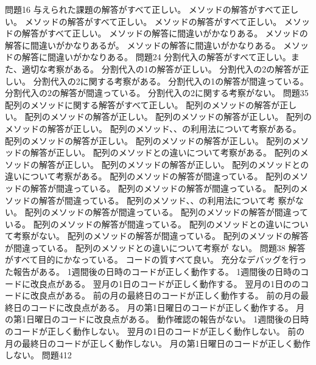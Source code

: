 {{問題1}{6}{
  {与えられた課題の解答がすべて正しい。}
	}
	{
	{メソッドの解答がすべて正しい。}
	{メソッドの解答がすべて正しい。}
	{メソッドの解答がすべて正しい。}
	{メソッドの解答がすべて正しい。}
	}
	{
	{メソッドの解答に間違いがかなりある。}
	{メソッドの解答に間違いがかなりあるが。}
	{メソッドの解答に間違いがかなりある。}
	{メソッドの解答に間違いがかなりある。}
	}
  {問題2}{4}{
	{分割代入の解答がすべて正しい。また、適切な考察がある。}
  }
  {
	{分割代入の1の解答が正しい。}
	{分割代入の2の解答が正しい。}
	{分割代入の2に関する考察がある。}
  }
  {
	{分割代入の1の解答が間違っている。}
	{分割代入の2の解答が間違っている。}
	{分割代入の2に関する考察がない。}
  }
  {問題3}{5}{
  {配列のメソッドに関する解答がすべて正しい。}
  }
  {
  {配列のメソッドの解答が正しい。}
  {配列のメソッドの解答が正しい。}
  {配列のメソッドの解答が正しい。}
  {配列のメソッドの解答が正しい。}
  {配列のメソッド、、の利用法について考察がある。}
  {配列のメソッドの解答が正しい。}
  {配列のメソッドの解答が正しい。}
  {配列のメソッドの解答が正しい。}
  {配列のメソッドとの違いについて考察がある。}
  {配列のメソッドの解答が正しい。}
  {配列のメソッドの解答が正しい。}
  {配列のメソッドとの違いについて考察がある。}
  }
  {
  {配列のメソッドの解答が間違っている。}
  {配列のメソッドの解答が間違っている。}
  {配列のメソッドの解答が間違っている。}
  {配列のメソッドの解答が間違っている。}
  {配列のメソッド、、の利用法について考
  察がない。}
  {配列のメソッドの解答が間違っている。}
  {配列のメソッドの解答が間違っている。}
  {配列のメソッドの解答が間違っている。}
  {配列のメソッドとの違いについて考察がない。}
  {配列のメソッドの解答が間違っている。}
  {配列のメソッドの解答が間違っている。}
  {配列のメソッドとの違いについて考察が
  ない。}
  }
	{問題3}{8}
	{
  {解答がすべて目的にかなっている。}
  {コードの質すべて良い。}
  {充分なデバッグを行った報告がある。}
  }
	{
  {1週間後の日時のコードが正しく動作する。}
  {1週間後の日時のコードに改良点がある。}
  {翌月の1日のコードが正しく動作する。}
  {翌月の1日ののコードに改良点がある。}
  {前の月の最終日のコードが正しく動作する。}
  {前の月の最終日のコードに改良点がある。}
  {月の第1日曜日のコードが正しく動作する。}
  {月の第1日曜日のコードに改良点がある。}
  {動作確認の報告がない。}
	}
	{
  {1週間後の日時のコードが正しく動作しない。}
  {翌月の1日のコードが正しく動作しない。}
  {前の月の最終日のコードが正しく動作しない。}
  {月の第1日曜日のコードが正しく動作しない。}
	}
	{問題4}{12}
	{
  }
	{
	}
	{
	}
}
